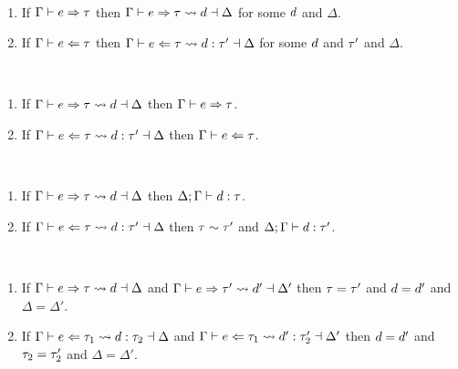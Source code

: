 \begin{theorem} ~
  \begin{enumerate}
    \item If $\Gamma \vdash e \Rightarrow \tau$ then $\Gamma \vdash e \Rightarrow \tau \leadsto d \dashv \Delta$ for some $d$ and $\Delta$.
    \item If $\Gamma \vdash e \Leftarrow \tau$ then $\Gamma \vdash e \Leftarrow \tau \leadsto d : \tau' \dashv \Delta$ for some $d$ and $\tau'$ and $\Delta$.
  \end{enumerate}
\end{theorem}

\begin{theorem} ~
  \begin{enumerate}
    \item If $\Gamma \vdash e \Rightarrow \tau \leadsto d \dashv \Delta$ then $\Gamma \vdash e \Rightarrow \tau$.
    \item If $\Gamma \vdash e \Leftarrow \tau \leadsto d : \tau' \dashv \Delta$ then $\Gamma \vdash e \Leftarrow \tau$.
  \end{enumerate}
\end{theorem}

\begin{theorem} ~
  \begin{enumerate}
    \item If $\Gamma \vdash e \Rightarrow \tau \leadsto d \dashv \Delta$ then $\Delta; \Gamma \vdash d : \tau$.
    \item If $\Gamma \vdash e \Leftarrow \tau \leadsto d : \tau' \dashv \Delta$ then $\tau \sim \tau'$ and $\Delta; \Gamma \vdash d : \tau'$.
  \end{enumerate}
\end{theorem}

\begin{theorem} ~
  \begin{enumerate}
    \item If $\Gamma \vdash e \Rightarrow \tau \leadsto d \dashv \Delta$ and $\Gamma \vdash e \Rightarrow \tau' \leadsto d' \dashv \Delta'$ then $\tau=\tau'$ and $d=d'$ and $\Delta=\Delta'$.
    \item If $\Gamma \vdash e \Leftarrow \tau_1 \leadsto d : \tau_2 \dashv \Delta$ and $\Gamma \vdash e \Leftarrow \tau_1 \leadsto d' : \tau_2' \dashv \Delta'$ then $d=d'$ and $\tau_2=\tau_2'$ and $\Delta=\Delta'$.
  \end{enumerate}
\end{theorem}

